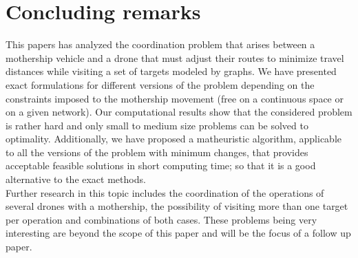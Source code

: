 \section{Concluding remarks}
\noindent
This papers has analyzed the coordination problem that arises between a mothership vehicle and a drone that must adjust their routes to minimize travel distances while visiting a set of targets modeled by graphs. We have presented exact formulations for different versions of the problem depending on the constraints imposed to the mothership movement (free on a continuous space or on a given network). Our computational results show that the considered problem is rather hard and only small to medium size problems can be  solved to optimality. Additionally, we have proposed a matheuristic algorithm, applicable to all the versions of the problem with minimum changes, that provides acceptable feasible solutions in short computing time;  so that it is a good alternative to the exact methods.\\
\noindent
Further research in this topic includes the coordination of the operations of several drones with a mothership, the possibility of visiting more than one target per operation and combinations of both cases. These problems being very interesting are beyond the scope of this paper and will be the focus of a follow up paper.







